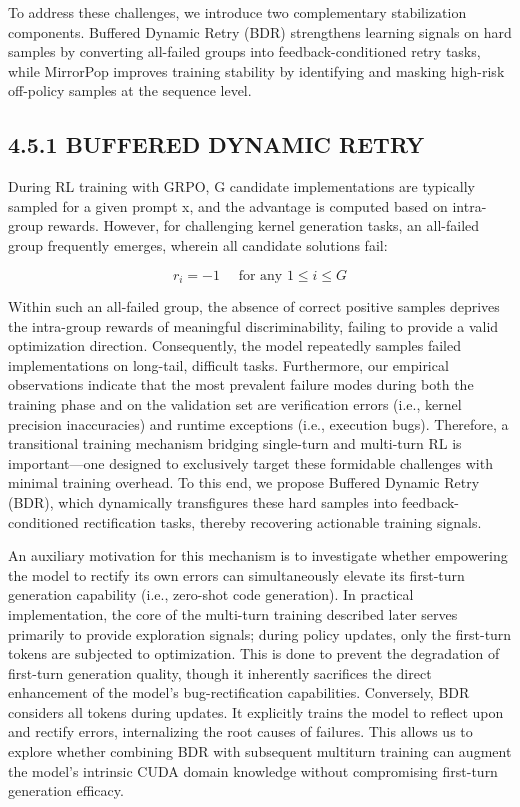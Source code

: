 \documentclass[
  10
]{article}
\begin{document}
To address these challenges, we introduce two complementary
stabilization components. Buffered Dynamic Retry (BDR) strengthens
learning signals on hard samples by converting all-failed groups into
feedback-conditioned retry tasks, while MirrorPop improves training
stability by identifying and masking high-risk off-policy samples at the
sequence level.

\subsection{4.5.1 BUFFERED DYNAMIC RETRY}\label{buffered-dynamic-retry}

During RL training with GRPO, G candidate implementations are typically
sampled for a given prompt x, and the advantage is computed based on
intra-group rewards. However, for challenging kernel generation tasks,
an all-failed group frequently emerges, wherein all candidate solutions
fail:

\[
r _ {i} = - 1 \quad \text { for   any } 1 \leq i \leq G\tag{13}
\]

Within such an all-failed group, the absence of correct positive samples
deprives the intra-group rewards of meaningful discriminability, failing
to provide a valid optimization direction. Consequently, the model
repeatedly samples failed implementations on long-tail, difficult tasks.
Furthermore, our empirical observations indicate that the most prevalent
failure modes during both the training phase and on the validation set
are verification errors (i.e., kernel precision inaccuracies) and
runtime exceptions (i.e., execution bugs). Therefore, a transitional
training mechanism bridging single-turn and multi-turn RL is
important---one designed to exclusively target these formidable
challenges with minimal training overhead. To this end, we propose
Buffered Dynamic Retry (BDR), which dynamically transfigures these hard
samples into feedback-conditioned rectification tasks, thereby
recovering actionable training signals.

An auxiliary motivation for this mechanism is to investigate whether
empowering the model to rectify its own errors can simultaneously
elevate its first-turn generation capability (i.e., zero-shot code
generation). In practical implementation, the core of the multi-turn
training described later serves primarily to provide exploration
signals; during policy updates, only the first-turn tokens are subjected
to optimization. This is done to prevent the degradation of first-turn
generation quality, though it inherently sacrifices the direct
enhancement of the model's bug-rectification capabilities. Conversely,
BDR considers all tokens during updates. It explicitly trains the model
to reflect upon and rectify errors, internalizing the root causes of
failures. This allows us to explore whether combining BDR with
subsequent multiturn training can augment the model's intrinsic CUDA
domain knowledge without compromising first-turn generation efficacy.
\end{document}
